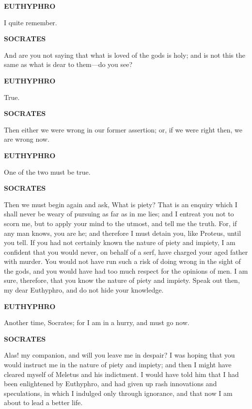 \documentclass[11pt,letter]{article}
\begin{document}
\par \textbf{EUTHYPHRO}
\par   I quite remember.

\par \textbf{SOCRATES}
\par   And are you not saying that what is loved of the gods is holy; and is not this the same as what is dear to them—do you see?

\par \textbf{EUTHYPHRO}
\par   True.

\par \textbf{SOCRATES}
\par   Then either we were wrong in our former assertion; or, if we were right then, we are wrong now.

\par \textbf{EUTHYPHRO}
\par   One of the two must be true.

\par \textbf{SOCRATES}
\par   Then we must begin again and ask, What is piety? That is an enquiry which I shall never be weary of pursuing as far as in me lies; and I entreat you not to scorn me, but to apply your mind to the utmost, and tell me the truth. For, if any man knows, you are he; and therefore I must detain you, like Proteus, until you tell. If you had not certainly known the nature of piety and impiety, I am confident that you would never, on behalf of a serf, have charged your aged father with murder. You would not have run such a risk of doing wrong in the sight of the gods, and you would have had too much respect for the opinions of men. I am sure, therefore, that you know the nature of piety and impiety. Speak out then, my dear Euthyphro, and do not hide your knowledge.

\par \textbf{EUTHYPHRO}
\par   Another time, Socrates; for I am in a hurry, and must go now.

\par \textbf{SOCRATES}
\par   Alas! my companion, and will you leave me in despair? I was hoping that you would instruct me in the nature of piety and impiety; and then I might have cleared myself of Meletus and his indictment. I would have told him that I had been enlightened by Euthyphro, and had given up rash innovations and speculations, in which I indulged only through ignorance, and that now I am about to lead a better life.

\par 
 
\end{document}
